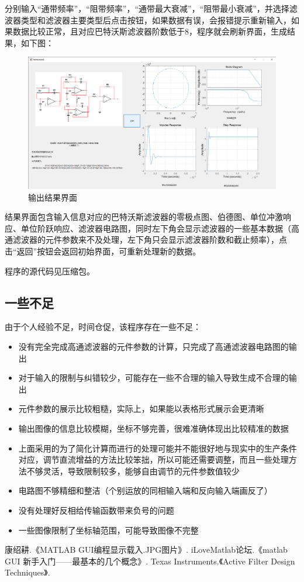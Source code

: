 \documentclass[UTF8]{ctexart}
\begin{document}
分别输入“通带频率”，“阻带频率”，“通带最大衰减”，“阻带最小衰减”，并选择滤波器类型和滤波器主要类型后点击按钮，如果数据有误，会报错提示重新输入，如果数据比较正常，且对应巴特沃斯滤波器阶数低于8，程序就会刷新界面，生成结果，如下图：
\begin{figure}[H]
\centering
\includegraphics[width=\textwidth]{8.png}
\caption{输出结果界面}
\end{figure}

结果界面包含输入信息对应的巴特沃斯滤波器的零极点图、伯德图、单位冲激响应、单位阶跃响应、滤波器电路图，同时左下角会显示滤波器的一些基本数据（高通滤波器的元件参数来不及处理，左下角只会显示滤波器阶数和截止频率），点击“返回”按钮会返回初始界面，可重新处理新的数据。

程序的源代码见压缩包。
\subsection{一些不足}
由于个人经验不足，时间仓促，该程序存在一些不足：
\begin{itemize}
\item 没有完全完成高通滤波器的元件参数的计算，只完成了高通滤波器电路图的输出
\item 对于输入的限制与纠错较少，可能存在一些不合理的输入导致生成不合理的输出
\item 元件参数的展示比较粗糙，实际上，如果能以表格形式展示会更清晰
\item 输出图像的信息比较模糊，坐标不够完善，很难准确体现出比较精准的数据
\item 上面采用的为了简化计算而进行的处理可能并不能很好地与现实中的生产条件对应，调节直流增益的方法比较笨拙，所以可能还需要调整，而且一些处理方法不够灵活，导致限制较多，能够自由调节的元件参数值较少
\item 电路图不够精细和整洁（个别运放的同相输入端和反向输入端画反了）
\item 没有处理好反相给传输函数带来负号的问题
\item 一些图像限制了坐标轴范围，可能导致图像不完整

\end{itemize}

\begin{thebibliography}{123456} 
 康绍耕.《MATLAB GUI编程显示载入.JPG图片》.
 iLoveMatlab论坛.《matlab GUI 新手入门——最基本的几个概念》.
 Texas Instruments.《Active Filter Design Techniques》.
\end{thebibliography}
\end{document}

